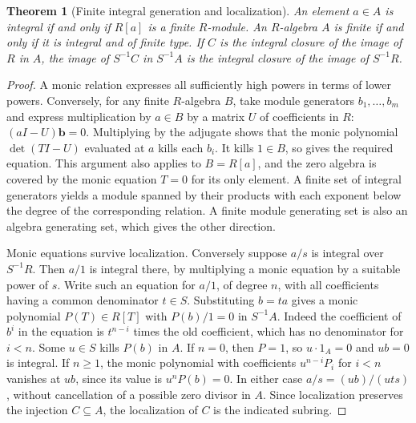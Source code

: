 \documentclass[11pt,oneside,openany]{book}
\newtheorem{theorem}{Theorem}[chapter]
\theoremstyle{definition}
\theoremstyle{remark}
\begin{document}
\begin{theorem}[Finite integral generation and localization]\label{p103:ALG-05-C01-S03}
An element \(a\in A\) is integral if and only if \(R[a]\) is a finite \(R\)-module. An \(R\)-algebra \(A\) is finite if and only if it is integral and of finite type. If \(C\) is the integral closure of the image of \(R\) in \(A\), the image of \(S^{-1}C\) in \(S^{-1}A\) is the integral closure of the image of \(S^{-1}R\).
\end{theorem}
\begin{proof}
A monic relation expresses all sufficiently high powers in terms of lower powers. Conversely, for any finite \(R\)-algebra \(B\), take module generators \(b_1,\ldots,b_m\) and express multiplication by \(a\in B\) by a matrix \(U\) of coefficients in \(R\): \((aI-U)\mathbf b=0\). Multiplying by the adjugate shows that the monic polynomial \(\det(TI-U)\) evaluated at \(a\) kills each \(b_i\). It kills \(1\in B\), so gives the required equation. This argument also applies to \(B=R[a]\), and the zero algebra is covered by the monic equation \(T=0\) for its only element. A finite set of integral generators yields a module spanned by their products with each exponent below the degree of the corresponding relation. A finite module generating set is also an algebra generating set, which gives the other direction.

Monic equations survive localization. Conversely suppose \(a/s\) is integral over \(S^{-1}R\). Then \(a/1\) is integral there, by multiplying a monic equation by a suitable power of \(s\). Write such an equation for \(a/1\), of degree \(n\), with all coefficients having a common denominator \(t\in S\). Substituting \(b=ta\) gives a monic polynomial \(P(T)\in R[T]\) with \(P(b)/1=0\) in \(S^{-1}A\). Indeed the coefficient of \(b^i\) in the equation is \(t^{n-i}\) times the old coefficient, which has no denominator for \(i<n\). Some \(u\in S\) kills \(P(b)\) in \(A\). If \(n=0\), then \(P=1\), so \(u\cdot 1_A=0\) and \(ub=0\) is integral. If \(n\geq1\), the monic polynomial with coefficients \(u^{n-i}P_i\) for \(i<n\) vanishes at \(ub\), since its value is \(u^nP(b)=0\). In either case \(a/s=(ub)/(uts)\), without cancellation of a possible zero divisor in \(A\). Since localization preserves the injection \(C\subseteq A\), the localization of \(C\) is the indicated subring.
\end{proof}
\end{document}
